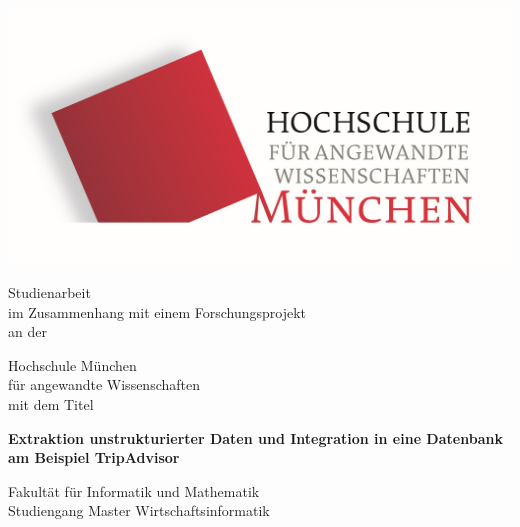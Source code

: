 \thispagestyle{empty}
\begin{center}
	\includegraphics[scale=0.5]{Bilder/HM1_logo.png}


	
	\vspace{1.5cm}
	\huge{Studienarbeit}\\\vspace{1.5cm}
	\large{im Zusammenhang mit einem Forschungsprojekt}\\\vspace{0.5cm}
	\large{an der}\\\vspace{0.5cm}
	
	\huge{Hochschule München}\\
	\normalsize {für angewandte Wissenschaften}\\\vspace{0.5cm}
	\large{mit dem Titel}\\\vspace{1cm}
    \begin{center}
		\Huge{\textbf{Extraktion unstrukturierter Daten und Integration in eine Datenbank am Beispiel TripAdvisor}}\\[2.0cm]
    \end{center}
    
	
	
	\large{Fakultät für Informatik und Mathematik}\\
	\normalsize {Studiengang Master Wirtschaftsinformatik}\\\vspace{2.1cm}
	
\end{center}

